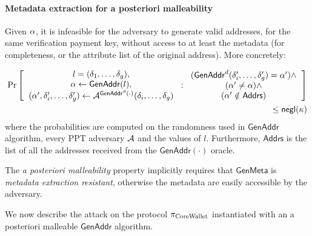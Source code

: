 \paragraph{Metadata extraction for a posteriori malleability}
Given $\alpha$, it is infeasible for the adversary to generate valid addresses,
\ie for the same verification payment key,  without access to at least the
metadata (for completeness, or the attribute list of the original address).
More concretely:

\begin{align}
    \Pr\left[
    \begin{tabular}{c}
    $l = (\attribute_{1}, \dots, \attribute_\addrgenlength)$, \\
    $\addr \leftarrow \mathsf{GenAddr}(l)$, \\
    $(\addr^\prime, \attribute^\prime_{i}, \dots, \attribute^\prime_\addrgenlength) \leftarrow \adversary^{\mathsf{GenAddr}^{d}(\cdot)}(\attribute_{i}, \dots, \attribute_\addrgenlength)$ \\
    \end{tabular}
     :
    \begin{tabular}{c}
    $(\mathsf{GenAddr}^{d}(\attribute^\prime_{i},\dots,\attribute^\prime_\addrgenlength)=\addr^\prime) \wedge $ \\
    $(\addr^\prime\neq\addr)\wedge$ \\
    $(\addr^\prime\notin \mathsf{Addrs})$ \\
    \end{tabular}
    \right]& \nonumber \\
    \leq \negl(\secparam) \nonumber
\end{align}
where the probabilities are computed on the randomness used in
$\mathsf{GenAddr}$ algorithm, every PPT adversary $\mathcal{A}$ and the values
of $l$. Furthermore, $\mathsf{Addrs}$ is the list of all the addresses received
from the $\mathsf{GenAddr}(\cdot)$ oracle.

\begin{remark*}
The \emph{a posteriori malleability} property implicitly
requires that $\mathsf{GenMeta}$ is \emph{metadata extraction resistant},
otherwise the metadata are easily accessible by the adversary.
\end{remark*}

We now describe the attack on the protocol $\pi_\mathrm{CoreWallet}$ instantiated with an a
posteriori malleable $\mathsf{GenAddr}$ algorithm.


